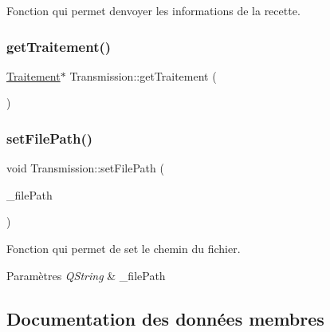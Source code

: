 Fonction qui permet d\textquotesingle{}envoyer les informations de la recette. 

\mbox{\label{classTransmission_af33687ff35d8e882db26c035ca6c053b}} 
\subsubsection{\texorpdfstring{get\+Traitement()}{getTraitement()}}
{\footnotesize\ttfamily \hyperlink{classTraitement}{Traitement}$\ast$ Transmission\+::get\+Traitement (\begin{DoxyParamCaption}{ }\end{DoxyParamCaption})\hspace{0.3cm}{\ttfamily [inline]}}

\mbox{\label{classTransmission_a5099a8d2ae60a2f159230bf81bafebdc}} 
\subsubsection{\texorpdfstring{set\+File\+Path()}{setFilePath()}}
{\footnotesize\ttfamily void Transmission\+::set\+File\+Path (\begin{DoxyParamCaption}\item[{Q\+String}]{\+\_\+file\+Path }\end{DoxyParamCaption})\hspace{0.3cm}{\ttfamily [inline]}}



Fonction qui permet de set le chemin du fichier. 


\begin{DoxyParams}{Paramètres}
{\em Q\+String} & \+\_\+file\+Path \\
\hline
\end{DoxyParams}


\subsection{Documentation des données membres}
\mbox{\label{classTransmission_a3514cc6116b900b586f8cbf194cb39e7}} 
